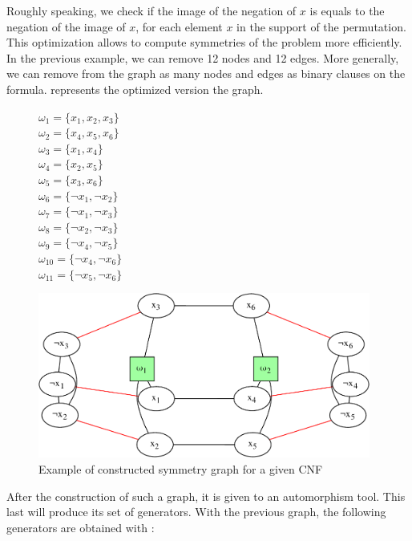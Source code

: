 Roughly speaking, we check if the image of the negation of $x$ is equals to the negation of the image of $x$,
for each element $x$ in the support of the permutation.
This optimization allows to compute symmetries of the problem more efficiently.
In the previous example, we can remove 12 nodes and 12 edges. More generally,
we can remove from the graph as many nodes and edges as binary clauses on the formula.
 represents the optimized version the graph.
\begin{figure}[!htbp]
 \begin{minipage}[r]{.2\textwidth}
   $\omega_{1} = \{ x_{1}, x_{2}, x_{3} \}$ \\
 $\omega_{2} = \{ x_{4}, x_{5}, x_{6} \}$ \\
 $\omega_{3} = \{ x_{1}, x_{4} \}$ \\
 $\omega_{4} = \{ x_{2}, x_{5} \}$ \\
 $\omega_{5} = \{ x_{3}, x_{6} \}$ \\
 $\omega_{6} = \{ \neg x_{1}, \neg x_{2} \}$ \\
 $\omega_{7} = \{ \neg x_{1}, \neg x_{3} \}$ \\
 $\omega_{8} = \{ \neg x_{2}, \neg x_{3} \}$ \\
 $\omega_{9} = \{ \neg x_{4}, \neg x_{5} \}$ \\
 $\omega_{10} = \{ \neg x_{4}, \neg x_{6} \}$ \\
 $\omega_{11} = \{ \neg x_{5}, \neg x_{6} \}$ \\
 \end{minipage}
 \begin{minipage}[r]{.75\textwidth}
  \includegraphics[width=4.3in]{cnfs/graph_cnf_opt-crop}
 \end{minipage}
 \caption{Example of constructed symmetry graph for a given CNF}
  \label{fig:graph_opt}
\end{figure}


After the construction of such a graph, it is given to an automorphism tool.
This last will produce its set of generators.
With the previous graph, the following generators are obtained with \bliss:


